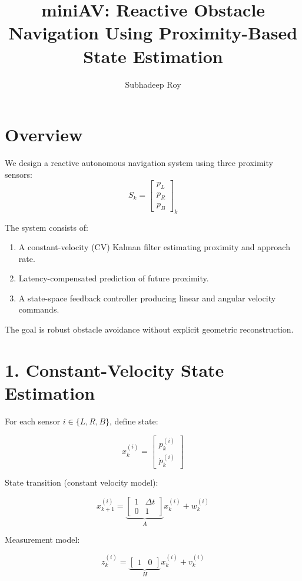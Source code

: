 \documentclass[11pt]{article}
\title{miniAV: Reactive Obstacle Navigation Using Proximity-Based State Estimation}
\author{Subhadeep Roy}
\date{}
\begin{document}
\maketitle

\section{Overview}

We design a reactive autonomous navigation system using three proximity sensors:
\[
S_k = 
\begin{bmatrix}
p_L \\
p_R \\
p_B
\end{bmatrix}_k
\]

The system consists of:

\begin{enumerate}
    \item A constant-velocity (CV) Kalman filter estimating proximity and approach rate.
    \item Latency-compensated prediction of future proximity.
    \item A state-space feedback controller producing linear and angular velocity commands.
\end{enumerate}

The goal is robust obstacle avoidance without explicit geometric reconstruction.

\section{1. Constant-Velocity State Estimation}

For each sensor $i \in \{L, R, B\}$, define state:

\[
x_k^{(i)} =
\begin{bmatrix}
p_k^{(i)} \\
\dot{p}_k^{(i)}
\end{bmatrix}
\]

State transition (constant velocity model):

\[
x_{k+1}^{(i)} =
\underbrace{
\begin{bmatrix}
1 & \Delta t \\
0 & 1
\end{bmatrix}
}_{A}
x_k^{(i)} + w_k^{(i)}
\]

Measurement model:

\[
z_k^{(i)} =
\underbrace{
\begin{bmatrix}
1 & 0
\end{bmatrix}
}_{H}
x_k^{(i)} + v_k^{(i)}
\]
\end{document}
